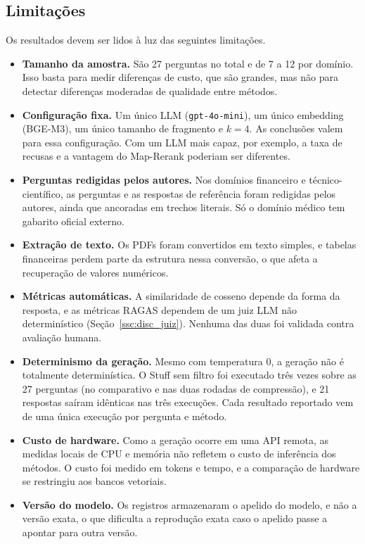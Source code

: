 \subsection{Limitações}

Os resultados devem ser lidos à luz das seguintes limitações.

\begin{itemize}
  \item \textbf{Tamanho da amostra.} São 27 perguntas no total e de 7 a 12 por domínio. Isso basta para medir diferenças de custo, que são grandes, mas não para detectar diferenças moderadas de qualidade entre métodos.
  \item \textbf{Configuração fixa.} Um único LLM (\texttt{gpt-4o-mini}), um único embedding (BGE-M3), um único tamanho de fragmento e $k = 4$. As conclusões valem para essa configuração. Com um LLM mais capaz, por exemplo, a taxa de recusas e a vantagem do Map-Rerank poderiam ser diferentes.
  \item \textbf{Perguntas redigidas pelos autores.} Nos domínios financeiro e técnico-científico, as perguntas e as respostas de referência foram redigidas pelos autores, ainda que ancoradas em trechos literais. Só o domínio médico tem gabarito oficial externo.
  \item \textbf{Extração de texto.} Os PDFs foram convertidos em texto simples, e tabelas financeiras perdem parte da estrutura nessa conversão, o que afeta a recuperação de valores numéricos.
  \item \textbf{Métricas automáticas.} A similaridade de cosseno depende da forma da resposta, e as métricas RAGAS dependem de um juiz LLM não determinístico (Seção~\ref{ssc:disc_juiz}). Nenhuma das duas foi validada contra avaliação humana.
  \item \textbf{Determinismo da geração.} Mesmo com temperatura 0, a geração não é totalmente determinística. O Stuff sem filtro foi executado três vezes sobre as 27 perguntas (no comparativo e nas duas rodadas de compressão), e 21 respostas saíram idênticas nas três execuções. Cada resultado reportado vem de uma única execução por pergunta e método.
  \item \textbf{Custo de hardware.} Como a geração ocorre em uma API remota, as medidas locais de CPU e memória não refletem o custo de inferência dos métodos. O custo foi medido em tokens e tempo, e a comparação de hardware se restringiu aos bancos vetoriais.
  \item \textbf{Versão do modelo.} Os registros armazenaram o apelido do modelo, e não a versão exata, o que dificulta a reprodução exata caso o apelido passe a apontar para outra versão.
\end{itemize}
